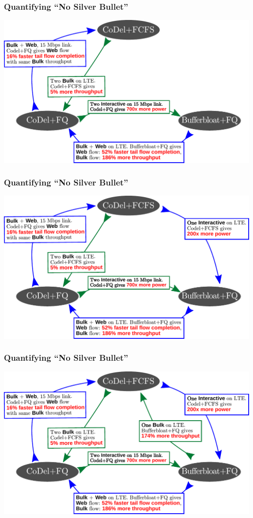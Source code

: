 \begin{Large}
\begin{frame}[plain]
\frametitle{Quantifying ``No Silver Bullet''}
\begin{center}
\includegraphics[width=\columnwidth]{fig-2.pdf}
\end{center}
\end{frame}

\begin{frame}[plain]
\frametitle{Quantifying ``No Silver Bullet''}
\begin{center}
\includegraphics[width=\columnwidth]{fig-1.pdf}
\end{center}
\end{frame}

\begin{frame}[plain]
\frametitle{Quantifying ``No Silver Bullet''}
\begin{center}
\includegraphics[width=\columnwidth]{fig.pdf}
\end{center}
\end{frame}


\end{Large}
